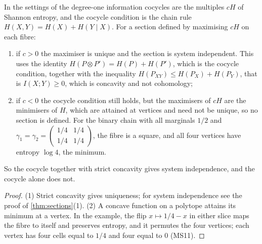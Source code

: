 \documentclass[11pt]{article}
\theoremstyle{definition}\newtheorem{definition}[theorem]{Definition}\newtheorem{remark}[theorem]{Remark}\newtheorem{example}[theorem]{Example}\newtheorem{problem}[theorem]{Open problem}\crefname{problem}{Problem}{Problems}
\begin{document}
\begin{proposition}\label{prop:cocycle}
In the settings of \cite{BaudotBennequin2015,Vigneaux2020} the degree-one information cocycles are the multiples $cH$ of Shannon entropy, and the cocycle condition is the chain rule $H(X,Y)=H(X)+H(Y\mid X)$. For a section defined by maximising $cH$ on each fibre:
\begin{enumerate}
\item[(1)] if $c>0$ the maximiser is unique and the section is system independent. This uses the identity $H(P\otimes P')=H(P)+H(P')$, which is the cocycle condition, together with the inequality $H(P_{XY})\le H(P_X)+H(P_Y)$, that is $I(X;Y)\ge0$, which is concavity and not cohomology;
\item[(2)] if $c<0$ the cocycle condition still holds, but the maximisers of $cH$ are the minimisers of $H$, which are attained at vertices and need not be unique, so no section is defined. For the binary chain with all marginals $1/2$ and $\gamma_1=\gamma_2=\left(\begin{smallmatrix}1/4&1/4\\1/4&1/4\end{smallmatrix}\right)$, the fibre is a square, and all four vertices have entropy $\log4$, the minimum.
\end{enumerate}
So the cocycle together with strict concavity gives system independence, and the cocycle alone does not.
\end{proposition}

\begin{proof}
(1) Strict concavity gives uniqueness; for system independence see the proof of \cref{thm:sections}(1). (2) A concave function on a polytope attains its minimum at a vertex. In the example, the flip $x\mapsto1/4-x$ in either slice maps the fibre to itself and preserves entropy, and it permutes the four vertices; each vertex has four cells equal to $1/4$ and four equal to $0$ (MS11).
\end{proof}
\end{document}
